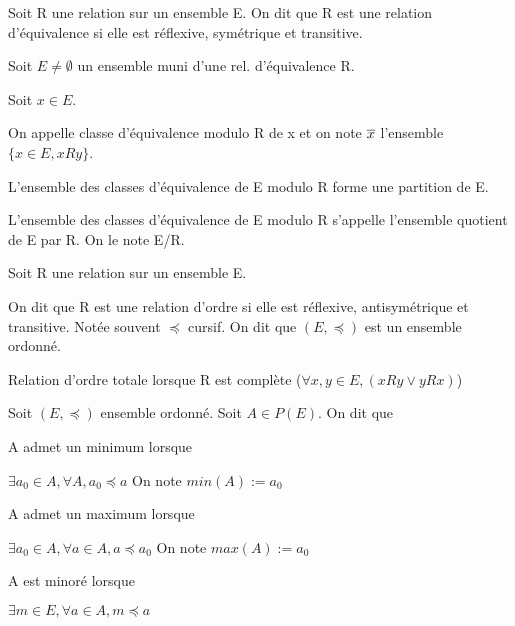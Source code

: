 \documentclass[a4paper, 12pt]{article}
\begin{document}
\begin{definition}
    Soit R une relation sur un ensemble E. On dit que R est une relation d'équivalence si elle est
    réflexive, symétrique et transitive.
\end{definition}

\begin{definition}
    Soit $E \neq \emptyset$ un ensemble muni d'une rel. d'équivalence R.

    Soit $x \in E$.

    On appelle classe d'équivalence modulo R de x et on note $\overline{x}$ l'ensemble $\{x \in E, xRy\}$.
\end{definition}

\begin{theorem}
    L'ensemble des classes d'équivalence de E modulo R forme une partition de E.
\end{theorem}

\begin{demonstration}
\end{demonstration}

\begin{definition}
    L'ensemble des classes d'équivalence de E modulo R s'appelle l'ensemble quotient
    de E par R. On le note E/R.
\end{definition}

\begin{definition}
    Soit R une relation sur un ensemble E.

    On dit que R est une relation d'ordre si elle est réflexive, antisymétrique et transitive.
    Notée souvent $\preccurlyeq$ cursif. On dit que $(E, \preccurlyeq)$ est un ensemble ordonné.

    Relation d'ordre totale lorsque R est complète ($\forall x, y \in E, (xRy \lor yRx)$)
\end{definition}

\begin{definition}
    Soit $(E, \preccurlyeq)$ ensemble ordonné. Soit $A \in P(E)$. On dit que

    \item A admet un minimum lorsque
    
    $\exists a_0 \in A, \forall A, a_0 \preccurlyeq a$ On note $min(A) := a_0$

    \item A admet un maximum lorsque
    
    $\exists a_0 \in A, \forall a \in A, a \preccurlyeq a_0$ On note $max(A) := a_0$

    \item A est minoré lorsque
    
    $\exists m \in E, \forall a \in A, m \preccurlyeq a$

\end{definition}
\end{document}
